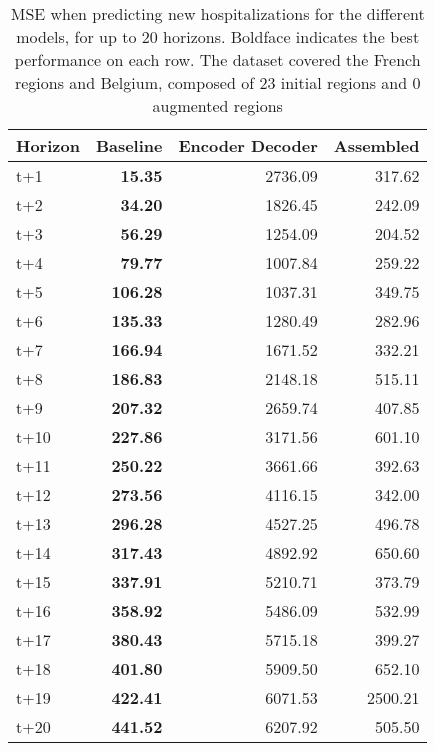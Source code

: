 \begin{table}[H]
\centering
\caption{MSE when predicting new hospitalizations for the different models, for up to 20 horizons. Boldface indicates the best performance on each row. The dataset covered the French regions and Belgium, composed of 23 initial regions and 0 augmented regions }
\label{tab:MSE_comparison}
\begin{tabular}{lrrr}
\toprule
Horizon &  Baseline &  Encoder Decoder &  Assembled \\
\midrule
t+1  & \textbf{15.35}  & 2736.09  & 317.62  \\
t+2  & \textbf{34.20}  & 1826.45  & 242.09  \\
t+3  & \textbf{56.29}  & 1254.09  & 204.52  \\
t+4  & \textbf{79.77}  & 1007.84  & 259.22  \\
t+5  & \textbf{106.28}  & 1037.31  & 349.75  \\
t+6  & \textbf{135.33}  & 1280.49  & 282.96  \\
t+7  & \textbf{166.94}  & 1671.52  & 332.21  \\
t+8  & \textbf{186.83}  & 2148.18  & 515.11  \\
t+9  & \textbf{207.32}  & 2659.74  & 407.85  \\
t+10  & \textbf{227.86}  & 3171.56  & 601.10  \\
t+11  & \textbf{250.22}  & 3661.66  & 392.63  \\
t+12  & \textbf{273.56}  & 4116.15  & 342.00  \\
t+13  & \textbf{296.28}  & 4527.25  & 496.78  \\
t+14  & \textbf{317.43}  & 4892.92  & 650.60  \\
t+15  & \textbf{337.91}  & 5210.71  & 373.79  \\
t+16  & \textbf{358.92}  & 5486.09  & 532.99  \\
t+17  & \textbf{380.43}  & 5715.18  & 399.27  \\
t+18  & \textbf{401.80}  & 5909.50  & 652.10  \\
t+19  & \textbf{422.41}  & 6071.53  & 2500.21  \\
t+20  & \textbf{441.52}  & 6207.92  & 505.50  \\

\bottomrule
\end{tabular}
\end{table}
